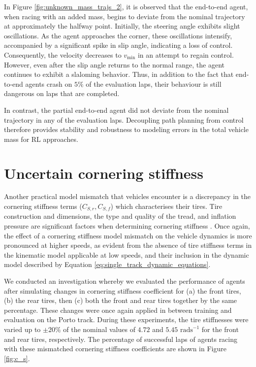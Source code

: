 In Figure \ref{fig:unknown_mass_trajs_2}, it is observed that the end-to-end agent, when racing with an added mass, begins to deviate from the nominal trajectory at approximately the halfway point. 
Initially, the steering angle exhibits slight oscillations. 
As the agent approaches the corner, these oscillations intensify, accompanied by a significant spike in slip angle, indicating a loss of control. 
Consequently, the velocity decreases to $v_{\text{min}}$ in an attempt to regain control. 
However, even after the slip angle returns to the normal range, the agent continues to exhibit a slaloming behavior.
Thus, in addition to the fact that end-to-end agents crash on $5\%$ of the evaluation laps, their behaviour is still dangerous on laps that are completed.

In contrast, the partial end-to-end agent did not deviate from the nominal trajectory in any of the evaluation laps.
Decoupling path planning from control therefore provides stability and robustness to modeling errors in the total vehicle mass for RL approaches.


\section{Uncertain cornering stiffness}

Another practical model mismatch that vehicles encounter is a discrepancy in the cornering stiffness terms ($C_{S,r}, C_{S,f}$) which characterises their tires.
Tire construction and dimensions, the type and quality of the tread, and inflation pressure are significant factors when determining cornering stiffness \cite{Vorotovic2013}.
Once again, the effect of a cornering stiffness model mismatch on the vehicle dynamics is more pronounced at higher speeds, as evident from the absence of tire stiffness terms in the kinematic model applicable at low speeds, and their inclusion in the dynamic model described by Equation \ref{eq:single_track_dynamic_equations}.


We conducted an investigation whereby we evaluated the performance of agents after simulating changes in cornering stiffness coefficient for (a) the front tires, (b) the rear tires, then (c) both the front and rear tires together by the same percentage.
These changes were once again applied in between training and evaluation on the Porto track.
During these experiments, the tire stiffnesses were varied up to $\pm 20 \%$ of the nominal values of $4.72$ and $5.45$ $\text{rads}^{-1}$ for the front and rear tires, respectively.
The percentage of successful laps of agents racing with these mismatched cornering stiffness coefficients are shown in Figure \ref{fig:c_s}.

